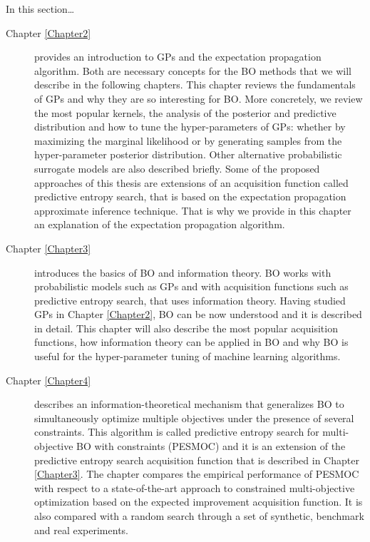 In this section\dots
\begin{description}

\item [{Chapter \ref{Chapter2}}] provides an introduction to GPs and the expectation propagation algorithm. Both are necessary concepts for the BO methods that we will describe in the following chapters. This chapter reviews the fundamentals of GPs and why they are so interesting for BO. More concretely, we review the most popular kernels, the analysis of the posterior and predictive distribution and how to tune the hyper-parameters of GPs: whether by maximizing the marginal likelihood or by generating samples from the hyper-parameter posterior distribution. Other alternative probabilistic surrogate models are also described briefly. Some of the proposed approaches of this thesis are extensions of an acquisition function called predictive entropy search, that is based on the expectation propagation approximate inference technique. That is why we provide in this chapter an explanation of the expectation propagation algorithm.

\item [{Chapter \ref{Chapter3}}] introduces the basics of BO and information theory. BO works with probabilistic models such as GPs and with acquisition functions such as predictive entropy search, that uses information theory. Having studied GPs in Chapter \ref{Chapter2}, BO can be now understood and it is described in detail. This chapter will also describe the most popular acquisition functions, how information theory can be applied in BO and why BO is useful for the hyper-parameter tuning of machine learning algorithms.

\item [{ Chapter \ref{Chapter4}}] describes an information-theoretical mechanism that generalizes BO to simultaneously optimize multiple objectives under the presence of several constraints. This algorithm is called predictive entropy search for multi-objective BO with constraints (PESMOC) and it is an extension of the predictive entropy search acquisition function that is described in Chapter \ref{Chapter3}. The chapter compares the empirical performance of PESMOC with respect to a state-of-the-art approach to constrained multi-objective optimization based on the expected improvement acquisition function. It is also compared with a random search through a set of synthetic, benchmark and real experiments. 


\end{description}
